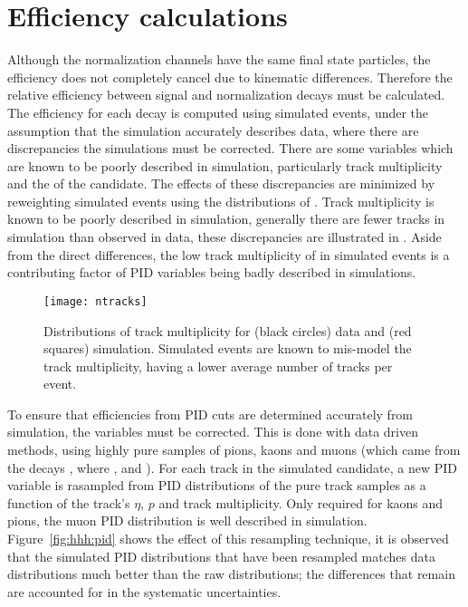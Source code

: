 \section{Efficiency calculations}
\label{sec:hhh:eff}

Although the normalization channels have the same final state particles, the efficiency does not
completely cancel due to kinematic differences.
Therefore the relative efficiency between signal and normalization decays must be calculated.
The efficiency for each decay is computed using simulated events, under the assumption that the
simulation accurately describes data, where there are discrepancies the simulations must be corrected.
There are some variables which are known to be poorly described in simulation, particularly track
multiplicity and the \chisqvtx of the \Bp candidate.
The effects of these discrepancies are minimized by reweighting simulated events using
the distributions of \btojpsikpipi.
Track multiplicity is known to be poorly described in simulation, generally there are fewer tracks
in simulation than observed in data,
these discrepancies are illustrated in .
Aside from the direct differences, the low track multiplicity of in simulated events is a
contributing factor of PID variables being badly described in simulations.

\begin{figure}
  \begin{center}
    \texttt{[image: ntracks]}
    \caption[Differences between track multiplicity in data and simulation]
    {\small
      Distributions of track multiplicity for (black circles) data and (red squares) simulation.
      Simulated events are known to mis-model the track multiplicity, having a lower average number
      of tracks per event.
    }
    \label{fig:hhh:ntracks}
  \end{center}
\end{figure}

To ensure that efficiencies from PID cuts are determined accurately from simulation, the variables
must be corrected.
This is done with data driven methods, using highly pure samples of pions, kaons
and muons (which came from the decays \decay{\Dstarp}{\Dz\pip}, where \decay{\Dz}{\Km\pip}, and
\jpsitomumu).
For each track in the simulated \Bp candidate, a new PID variable is rasampled from PID
distributions of the pure track samples as a function of the track's $\eta$, $p$ and track
multiplicity.
Only required for kaons and pions, the muon PID distribution is well described in simulation.
Figure~\ref{fig:hhh:pid} shows the effect of this resampling technique, it is observed that the
simulated PID distributions that have been resampled matches data distributions much better than the
raw distributions; the differences that remain are accounted for in the systematic uncertainties.

